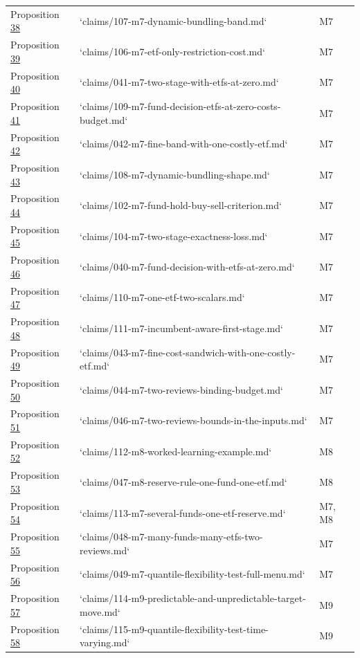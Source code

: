 \documentclass[11pt]{article}
\begin{document}
{\begin{longtable}{lll}
Proposition \hyperref[res:Proposition-38]{38} & `claims/107-m7-dynamic-bundling-band.md` & M7 \\
Proposition \hyperref[res:Proposition-39]{39} & `claims/106-m7-etf-only-restriction-cost.md` & M7 \\
Proposition \hyperref[res:Proposition-40]{40} & `claims/041-m7-two-stage-with-etfs-at-zero.md` & M7 \\
Proposition \hyperref[res:Proposition-41]{41} & `claims/109-m7-fund-decision-etfs-at-zero-costs-budget.md` & M7 \\
Proposition \hyperref[res:Proposition-42]{42} & `claims/042-m7-fine-band-with-one-costly-etf.md` & M7 \\
Proposition \hyperref[res:Proposition-43]{43} & `claims/108-m7-dynamic-bundling-shape.md` & M7 \\
Proposition \hyperref[res:Proposition-44]{44} & `claims/102-m7-fund-hold-buy-sell-criterion.md` & M7 \\
Proposition \hyperref[res:Proposition-45]{45} & `claims/104-m7-two-stage-exactness-loss.md` & M7 \\
Proposition \hyperref[res:Proposition-46]{46} & `claims/040-m7-fund-decision-with-etfs-at-zero.md` & M7 \\
Proposition \hyperref[res:Proposition-47]{47} & `claims/110-m7-one-etf-two-scalars.md` & M7 \\
Proposition \hyperref[res:Proposition-48]{48} & `claims/111-m7-incumbent-aware-first-stage.md` & M7 \\
Proposition \hyperref[res:Proposition-49]{49} & `claims/043-m7-fine-cost-sandwich-with-one-costly-etf.md` & M7 \\
Proposition \hyperref[res:Proposition-50]{50} & `claims/044-m7-two-reviews-binding-budget.md` & M7 \\
Proposition \hyperref[res:Proposition-51]{51} & `claims/046-m7-two-reviews-bounds-in-the-inputs.md` & M7 \\
Proposition \hyperref[res:Proposition-52]{52} & `claims/112-m8-worked-learning-example.md` & M8 \\
Proposition \hyperref[res:Proposition-53]{53} & `claims/047-m8-reserve-rule-one-fund-one-etf.md` & M8 \\
Proposition \hyperref[res:Proposition-54]{54} & `claims/113-m7-several-funds-one-etf-reserve.md` & M7, M8 \\
Proposition \hyperref[res:Proposition-55]{55} & `claims/048-m7-many-funds-many-etfs-two-reviews.md` & M7 \\
Proposition \hyperref[res:Proposition-56]{56} & `claims/049-m7-quantile-flexibility-test-full-menu.md` & M7 \\
Proposition \hyperref[res:Proposition-57]{57} & `claims/114-m9-predictable-and-unpredictable-target-move.md` & M9 \\
Proposition \hyperref[res:Proposition-58]{58} & `claims/115-m9-quantile-flexibility-test-time-varying.md` & M9 \\
\end{longtable}}
\end{document}

